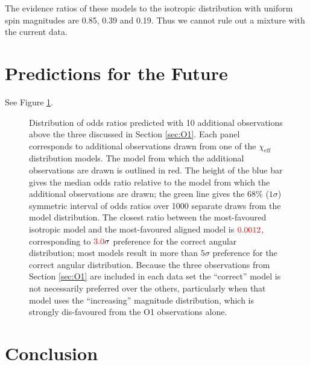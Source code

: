 \documentclass[modern]{aastex61}
\newcommand{\chieff}{\chi_\mathrm{eff}}
\newcommand{\checkme}[1]{\textcolor{red}{#1}}
\newcommand{\OTwoSigmaIsoAlignedMin}{\checkme{3.0}}
\newcommand{\OTwoOddsIsoAlignedMin}{\checkme{0.0012}}
\begin{document}
The evidence ratios of these models to the isotropic distribution with uniform spin magnitudes are 0.85, 0.39 and 0.19. Thus we cannot rule out a mixture with the current data. 


\section{Predictions for the Future}

See Figure \ref{fig:O2-predictions}.

\begin{figure}
  \caption{\label{fig:O2-predictions} Distribution of odds ratios
    predicted with 10 additional observations above the three
    discussed in Section \ref{sec:O1}.  Each panel corresponds to
    additional observations drawn from one of the $\chieff$
    distribution models.  The model from which the additional
    observations are drawn is outlined in red.  The height of the blue
    bar gives the median odds ratio relative to the model from which
    the additional observations are drawn; the green line gives the
    68\% ($1 \sigma$) symmetric interval of odds ratios over 1000
    separate draws from the model distribution.  The closest ratio
    between the most-favoured isotropic model and the most-favoured
    aligned model is $\OTwoOddsIsoAlignedMin$, corresponding to
    $\OTwoSigmaIsoAlignedMin\sigma$ preference for the correct angular
    distribution; most models result in more than $5\sigma$ preference
    for the correct angular distribution.  Because the three
    observations from Section \ref{sec:O1} are included in each data
    set the ``correct'' model is not necessarily preferred over the
    others, particularly when that model uses the ``increasing''
    magnitude distribution, which is strongly dis-favoured from the O1
    observations alone.}
\end{figure}

\section{Conclusion}


\end{document}
